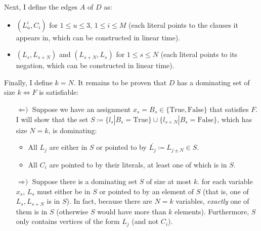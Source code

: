 \documentclass{amsart}
\theoremstyle{plain}
\theoremstyle{definition}
\begin{document}
\begin{enumerate}[label=\textbf{Exercise \arabic*:}, leftmargin=0cm, labelwidth=-0.2cm, align=left]
\begin{itemize}
            \end{itemize}

            Next, I define the edges $A$ of $D$ as:
            \begin{itemize}
                \item $\left( L^i_u, C_i \right)$ for $1 \leq u \leq 3,\, 1 \leq i \leq M$
                (each literal points to the clauses it appears in, which can be constructed in linear time).

                \item $\left( L_s, L_{s+N} \right)$ and $\left( L_{s+N}, L_{s} \right)$ for $1 \leq s \leq N$
                (each literal points to its negation, which can be constructed in linear time).

            \end{itemize}

            Finally, I define $k = N$.
            It remains to be proven that $D$ has a dominating set of size $k \iff F$ is satisfiable:


            \begin{itemize}

                \item[$\Leftarrow\text{)}$] Suppose we have an assignment $x_s = B_s \in \{\text{True}, \text{False}\}$
                that satisfies $F$.
                I will show that the set $S \coloneqq \{l_s | B_s = \text{True}\} \cup \{l_{s+N} | B_s = \text{False}\}$,
                which has size $N=k$, is dominating:
                \begin{itemize}
                    \item All $L_j$ are either in $S$ or pointed to by $ \overline{L_j} \coloneqq L_{j \pm N} \in S$.
                    \item All $C_i$ are pointed to by their literals, at least one of which is in $S$.
                \end{itemize}

                \item[$\Rightarrow\text{)}$] Suppose there is a dominating set $S$ of size at most $k$.
                for each variable $x_s$, $L_s$ must either be in $S$ or pointed to by an element of $S$
                (that is, one of $L_s, L_{s+N}$ is in $S$). In fact, because there are $N=k$ variables,
                \emph{exactly} one of them is in $S$ (otherwise $S$ would have more than $k$ elements).
                Furthermore, $S$ only contains vertices of the form $L_j$ (and not $C_i$).


\end{itemize}
\end{enumerate}
\end{document}
